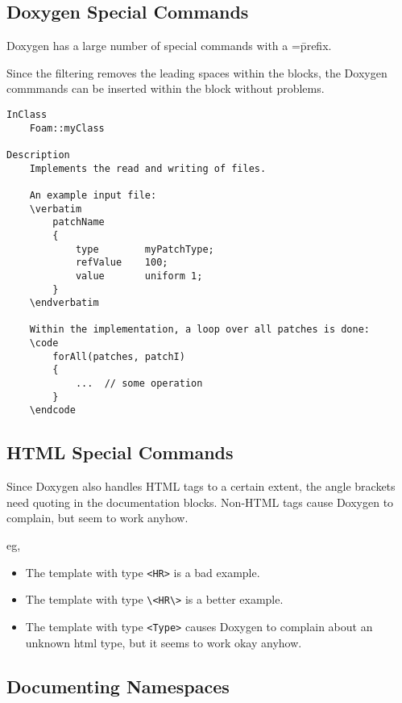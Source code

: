 \documentclass[11pt]{article}
\begin{document}
\subsection{Doxygen Special Commands}
\label{sec-1-12}

    Doxygen has a large number of special commands with a =\= prefix.

    Since the filtering removes the leading spaces within the blocks, the
    Doxygen commmands can be inserted within the block without problems.

\begin{verbatim}
InClass
    Foam::myClass

Description
    Implements the read and writing of files.

    An example input file:
    \verbatim
        patchName
        {
            type        myPatchType;
            refValue    100;
            value       uniform 1;
        }
    \endverbatim

    Within the implementation, a loop over all patches is done:
    \code
        forAll(patches, patchI)
        {
            ...  // some operation
        }
    \endcode
\end{verbatim}
\subsection{HTML Special Commands}
\label{sec-1-13}

    Since Doxygen also handles HTML tags to a certain extent, the angle
    brackets need quoting in the documentation blocks. Non-HTML tags cause
    Doxygen to complain, but seem to work anyhow.

    eg,
\begin{itemize}
\item The template with type \texttt{<HR>} is a bad example.
\item The template with type \texttt{\textbackslash{}<HR\textbackslash{}>} is a better example.
\item The template with type \texttt{<Type>} causes Doxygen to complain about an
      unknown html type, but it seems to work okay anyhow.
\end{itemize}
\subsection{Documenting Namespaces}
\label{sec-1-14}
\end{document}
